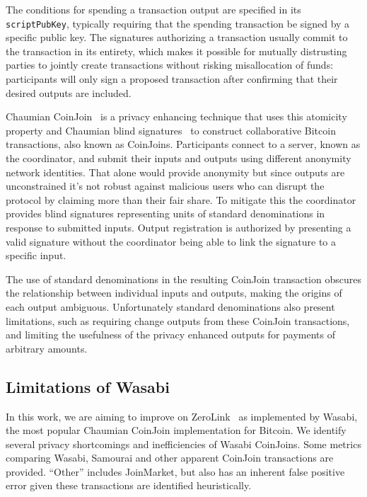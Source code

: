 \documentclass{article}
\begin{document}
The conditions for spending a transaction output are specified in its \texttt{scriptPubKey}, typically requiring that the spending transaction be signed by a specific public key. The signatures authorizing a transaction usually commit to the transaction in its entirety, which makes it possible for mutually distrusting parties to jointly create transactions without risking misallocation of funds: participants will only sign a proposed transaction after confirming that their desired outputs are included.

Chaumian CoinJoin~\cite{mizrahi2013blind,maxwell2013coinjoin,zerolink} is a privacy enhancing technique that uses this atomicity property and Chaumian blind signatures~\cite{chaum1983blind} to construct collaborative Bitcoin transactions, also known as CoinJoins. Participants connect to a server, known as the coordinator, and submit their inputs and outputs using different anonymity network identities. That alone would provide anonymity but since outputs are unconstrained it's not robust against malicious users who can disrupt the protocol by claiming more than their fair share. To mitigate this the coordinator provides blind signatures representing units of standard denominations in response to submitted inputs. Output registration is authorized by presenting a valid signature without the coordinator being able to link the signature to a specific input.

The use of standard denominations in the resulting CoinJoin transaction obscures the relationship between individual inputs and outputs, making the origins of each output ambiguous. Unfortunately standard denominations also present limitations, such as requiring change outputs from these CoinJoin transactions, and limiting the usefulness of the privacy enhanced outputs for payments of arbitrary amounts.

\subsection{Limitations of Wasabi}
In this work, we are aiming to improve on ZeroLink~\cite{zerolink} as implemented by Wasabi, the most popular Chaumian CoinJoin implementation for Bitcoin. We identify several privacy shortcomings and inefficiencies of Wasabi CoinJoins. Some metrics comparing Wasabi, Samourai and other apparent CoinJoin transactions are provided. ``Other'' includes JoinMarket, but also has an inherent false positive error given these transactions are identified heuristically.
\end{document}
